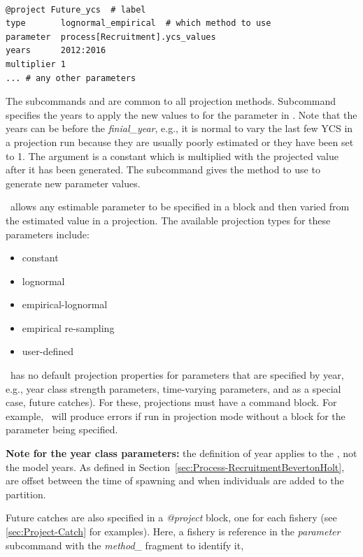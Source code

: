 {\small{\begin{verbatim}

@project Future_ycs  # label
type       lognormal_empirical  # which method to use
parameter  process[Recruitment].ycs_values
years      2012:2016
multiplier 1
... # any other parameters
\end{verbatim}}}

The subcommands  and  are common to all projection methods. Subcommand  specifies the years to apply the new values to for the parameter in . Note that the years can be before the \textit{finial\_year}, e.g., it is normal to vary the last few YCS in a projection run because they are usually poorly estimated or they have been set to 1.  The argument  is a constant which is multiplied with the projected value after it has been generated. The  subcommand gives the method to use to generate new parameter values.

\CNAME\ allows any estimable parameter to be specified in a  block and then varied from the estimated value in a projection. The available projection types for these parameters include:

\begin{itemize}
	\item constant
	\item lognormal
	\item empirical-lognormal
	\item empirical re-sampling
	\item user-defined
\end{itemize}

\CNAME\ has no default projection properties for parameters that are specified by year, e.g., year class strength parameters, time-varying parameters, and as a special case, future catches). For these, projections  must have a  command block. For example, \CNAME\ will produce errors if run in projection mode without a  block for the  parameter being specified.

\textbf{Note for the year class parameters:} the definition of year applies to the , not the model years. As defined in Section~\ref{sec:Process-RecruitmentBevertonHolt},  are offset between the time of spawning and when individuals are added to the partition.

Future catches are also specified in a \textit{@project} block, one for each fishery (see \ref{sec:Project-Catch} for examples). Here, a fishery is reference in the \textit{parameter} subcommand with the \textit{method\_} fragment to identify it,

